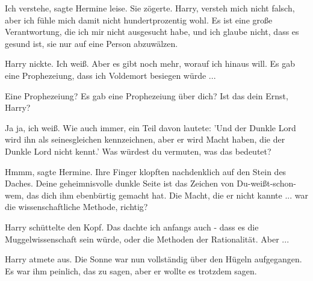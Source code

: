 \glqq{}Ich verstehe\grqq{}, sagte Hermine leise. Sie zögerte. \glqq{}Harry,
versteh mich nicht falsch, aber ich fühle mich damit nicht hundertprozentig
wohl. Es ist eine große Verantwortung, die ich mir nicht ausgesucht habe, und
ich glaube nicht, dass es gesund ist, sie nur auf eine Person abzuwälzen.\grqq{}

Harry nickte. \glqq{}Ich weiß. Aber es gibt noch mehr, worauf ich hinaus will. Es
gab eine Prophezeiung, dass ich Voldemort besiegen würde ...\grqq{}

\glqq{}Eine Prophezeiung? Es gab eine Prophezeiung über dich? Ist das dein Ernst,
Harry?\grqq{}

\glqq{}Ja ja, ich weiß. Wie auch immer, ein Teil davon lautete: 'Und der Dunkle
Lord wird ihn als seinesgleichen kennzeichnen, aber er wird Macht haben, die der
Dunkle Lord nicht kennt.' Was würdest du vermuten, was das bedeutet?\grqq{}

\glqq{}Hmmm\grqq{}, sagte Hermine. Ihre Finger klopften nachdenklich auf den
Stein des Daches. \glqq{}Deine geheimnisvolle dunkle Seite ist das Zeichen von
Du-weißt-schon-wem, das dich ihm ebenbürtig gemacht hat. Die Macht, die er nicht
kannte ... war die wissenschaftliche Methode, richtig?\grqq{}

Harry schüttelte den Kopf. \glqq{}Das dachte ich anfangs auch - dass es die
Muggelwissenschaft sein würde, oder die Methoden der Rationalität. Aber ...\grqq{}

Harry atmete aus. Die Sonne war nun vollständig über den Hügeln aufgegangen. Es
war ihm peinlich, das zu sagen, aber er wollte es trotzdem sagen.


